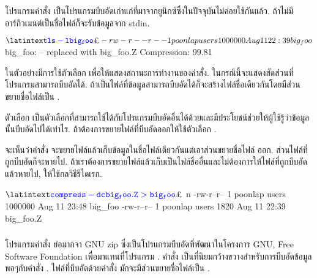 \begin{thwbr}
\subsubsection{}
โปรแกรมคำสั่ง  เป็นโปรแกรมบีบอัดเก่าแก่ที่มาจากยูนิกซ์ซึ่งในปัจจุบันไม่ค่อยใช้กันแล้ว. ถ้าไม่มีอาร์กิวเมนต์เป็นชื่อไฟล์ก็จะรับข้อมูลจาก stdin.
\begin{MyExample}
\begin{MyEx}
$ \cin{ls -l big_foo}
-rw-r--r--    1 poonlap  users     1000000 Aug 11 22:39 big_foo
$ 
big_foo:  -- replaced with big_foo.Z Compression: 99.81%
\end{MyEx}
\end{MyExample}
ในตัวอย่างมีการใช้ตัวเลือก  เพื่อให้แสดงสถานะการทำงานของคำสั่ง. ในกรณีนี้จะแสดงสัดส่วนที่โปรแกรมสามารถบีบอัดได้. ถ้าเป็นไฟล์ที่ข้อมูลสามารถบีบอัดได้ก็จะสร้างไฟล์ชื่อเดียวกันโดยมีส่วนขยายชื่อไฟล์เป็น . 

ตัวเลือก  เป็นตัวเลือกที่สามารถใช้ได้กับโปรแกรมบีบอัดอื่นได้ด้วยและมีประโยชน์ช่วยให้ผู้ใช้รู้ว่าข้อมูลนั้นบีบอัดไปได้เท่าไร. ถ้าต้องการขยายไฟล์ที่บีบอัดออกให้ใช้ตัวเลือก .
\begin{MyExample}
\end{MyExample}%
จะเห็นว่าคำสั่ง  จะขยายไฟล์แล้วเก็บข้อมูลในชื่อไฟล์เดียวกันแต่เอาส่วนขยายชื่อไฟล์  ออก. ส่วนไฟล์ที่ถูกบีบอัดก็จะหายไป. ถ้าเราต้องการขยายไฟล์แล้วเก็บเป็นไฟล์ชื่ออื่นและไม่ต้องการให้ไฟล์ที่ถูกบีบอัดแล้วหายไป, ให้ใช้กลวิธีรีไดเรก.
\begin{MyExample}
\begin{MyEx}
$ 
$ n
-rw-r--r--    1 poonlap  users     1000000 Aug 11 23:48 big_foo
-rw-r--r--    1 poonlap  users        1820 Aug 11 22:39 big_foo.Z
\end{MyEx}
\end{MyExample}

\subsubsection{}
โปรแกรมคำสั่ง \cite{gzip} ย่อมากจา GNU zip ซึ่งเป็นโปรแกรมบีบอัดที่พัฒนาในโครงการ GNU, Free Software Foundation เพื่อมาแทนที่โปรแกรม . คำสั่ง  เป็นที่นิยมกว้างขวางสำหรับการบีบอัดข้อมูลพอๆกับคำสั่ง . ไฟล์ที่บีบอัดด้วยคำสั่ง  มักจะมีส่วนขยายชื่อไฟล์เป็น .


\end{thwbr}

